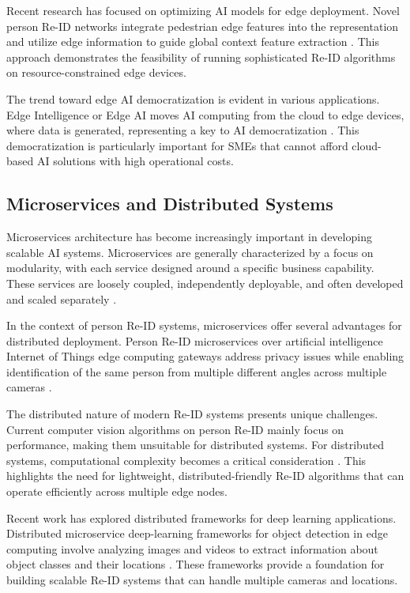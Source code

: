 \documentclass[../main.tex]{subfiles}
\begin{document}
Recent research has focused on optimizing AI models for edge deployment. Novel person Re-ID networks integrate pedestrian edge features into the representation and utilize edge information to guide global context feature extraction \cite{mdpi2024_edge}. This approach demonstrates the feasibility of running sophisticated Re-ID algorithms on resource-constrained edge devices.

The trend toward edge AI democratization is evident in various applications. Edge Intelligence or Edge AI moves AI computing from the cloud to edge devices, where data is generated, representing a key to AI democratization \cite{viso2024}. This democratization is particularly important for SMEs that cannot afford cloud-based AI solutions with high operational costs.


\subsection{Microservices and Distributed Systems}
\label{sec:microservice}

Microservices architecture has become increasingly important in developing scalable AI systems. Microservices are generally characterized by a focus on modularity, with each service designed around a specific business capability. These services are loosely coupled, independently deployable, and often developed and scaled separately \cite{wiki2024_microservices}.

In the context of person Re-ID systems, microservices offer several advantages for distributed deployment. Person Re-ID microservices over artificial intelligence Internet of Things edge computing gateways address privacy issues while enabling identification of the same person from multiple different angles across multiple cameras \cite{mdpi2021_microservice}.

The distributed nature of modern Re-ID systems presents unique challenges. Current computer vision algorithms on person Re-ID mainly focus on performance, making them unsuitable for distributed systems. For distributed systems, computational complexity becomes a critical consideration \cite{ieee2015_distributed}. This highlights the need for lightweight, distributed-friendly Re-ID algorithms that can operate efficiently across multiple edge nodes.

Recent work has explored distributed frameworks for deep learning applications. Distributed microservice deep-learning frameworks for object detection in edge computing involve analyzing images and videos to extract information about object classes and their locations \cite{mdpi2023_framework}. These frameworks provide a foundation for building scalable Re-ID systems that can handle multiple cameras and locations.
\end{document}
